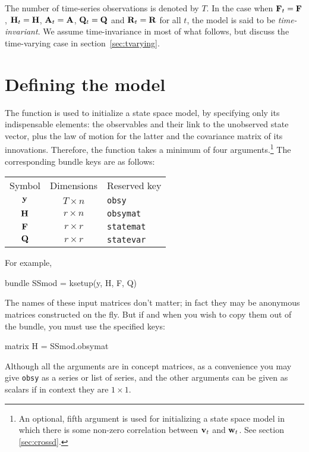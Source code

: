 \documentclass[a4paper]{article}
\begin{document}
The number of time-series observations is denoted by $T$.  In the case
when $\mathbf{F}_t = \mathbf{F}$, $\mathbf{H}_t = \mathbf{H}$,
$\mathbf{A}_t = \mathbf{A}$, $\mathbf{Q}_t = \mathbf{Q}$ and
$\mathbf{R}_t = \mathbf{R}$ for all $t$, the model is said to be
\emph{time-invariant}. We assume time-invariance in most of what
follows, but discuss the time-varying case in
section~\ref{sec:tvarying}.

\section{Defining the model}
\label{sec:setup}

The  function is used to initialize a state space
model, by specifying only its indispensable elements: the observables
and their link to the unobserved state vector, plus the law of motion
for the latter and the covariance matrix of its
innovations. Therefore, the function takes a minimum of four
arguments.\footnote{An optional, fifth argument is used for
  initializing a state space model in which there is some non-zero
  correlation between $\mathbf{v}_t$ and $\mathbf{w}_t$. See section
  \ref{sec:crossd}.} The corresponding bundle keys are as follows:

\begin{center}
\begin{tabular}{ccl}
Symbol & Dimensions & Reserved key \\[6pt]
$\mathbf{y}$      & $T \times n$ & \texttt{obsy}\\
$\mathbf{H}$      & $r \times n$ & \texttt{obsymat}\\
$\mathbf{F}$    & $r \times r$ & \texttt{statemat}\\
$\mathbf{Q}$      & $r \times r$ & \texttt{statevar}\\
\end{tabular}
\end{center}

For example,
\begin{code}
bundle SSmod = ksetup(y, H, F, Q)
\end{code} 

The names of these input matrices don't matter; in fact they may be
anonymous matrices constructed on the fly. But if and when you wish to
copy them out of the bundle, you must use the specified keys:
\begin{code}
matrix H = SSmod.obsymat
\end{code}

Although all the arguments are in concept matrices, as a convenience
you may give \texttt{obsy} as a series or list of series, and the
other arguments can be given as scalars if in context they are
$1 \times 1$.
\end{document}
